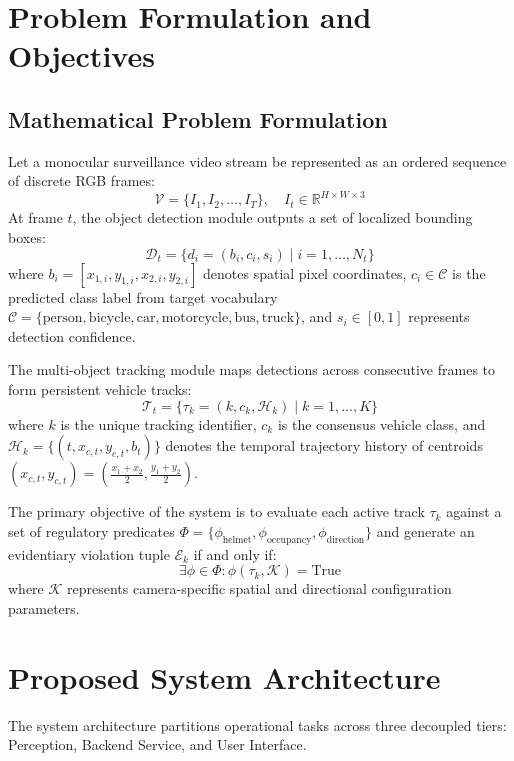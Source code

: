\documentclass[conference]{IEEEtran}
\begin{document}
\section{Problem Formulation and Objectives}

\subsection{Mathematical Problem Formulation}
Let a monocular surveillance video stream be represented as an ordered sequence of discrete RGB frames:
\begin{equation}
\mathcal{V} = \{I_1, I_2, \dots, I_T\}, \quad I_t \in \mathbb{R}^{H \times W \times 3}
\end{equation}
At frame $t$, the object detection module outputs a set of localized bounding boxes:
\begin{equation}
\mathcal{D}_t = \{d_i = (b_i, c_i, s_i) \mid i = 1, \dots, N_t\}
\end{equation}
where $b_i = [x_{1,i}, y_{1,i}, x_{2,i}, y_{2,i}]$ denotes spatial pixel coordinates, $c_i \in \mathcal{C}$ is the predicted class label from target vocabulary $\mathcal{C} = \{\text{person}, \text{bicycle}, \text{car}, \text{motorcycle}, \text{bus}, \text{truck}\}$, and $s_i \in [0, 1]$ represents detection confidence.

The multi-object tracking module maps detections across consecutive frames to form persistent vehicle tracks:
\begin{equation}
\mathcal{T}_t = \{\tau_k = (k, c_k, \mathcal{H}_k) \mid k = 1, \dots, K\}
\end{equation}
where $k$ is the unique tracking identifier, $c_k$ is the consensus vehicle class, and $\mathcal{H}_k = \{(t, x_{c,t}, y_{c,t}, b_{t})\}$ denotes the temporal trajectory history of centroids $(x_{c,t}, y_{c,t}) = \left(\frac{x_1+x_2}{2}, \frac{y_1+y_2}{2}\right)$.

The primary objective of the system is to evaluate each active track $\tau_k$ against a set of regulatory predicates $\Phi = \{\phi_{\text{helmet}}, \phi_{\text{occupancy}}, \phi_{\text{direction}}\}$ and generate an evidentiary violation tuple $\mathcal{E}_k$ if and only if:
\begin{equation}
\exists \phi \in \Phi : \phi(\tau_k, \mathcal{K}) = \text{True}
\end{equation}
where $\mathcal{K}$ represents camera-specific spatial and directional configuration parameters.

\section{Proposed System Architecture}
The system architecture partitions operational tasks across three decoupled tiers: Perception, Backend Service, and User Interface.
\end{document}
